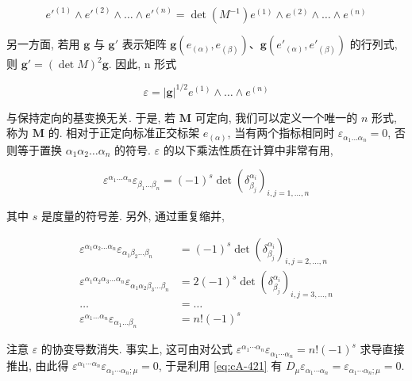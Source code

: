 \[
e'^{(1)} \wedge e'^{(2)} \wedge \dots \wedge e'^{(n)} = \det(M^{-1})e^{(1)} \wedge e^{(2)} \wedge \dots \wedge e^{(n)}
\]

另一方面, 若用 $\mathbf{g}$ 与 $\mathbf{g}'$ 表示矩阵 $\mathbf{g}(e_{(\alpha)}, e_{(\beta)})$、$\mathbf{g}(e'_{(\alpha)}, e'_{(\beta)})$ 的行列式, 则 $\mathbf{g}' = (\det M)^2\mathbf{g}$. 因此, n 形式

\begin{equation}
\varepsilon = |\mathbf{g}|^{1/2}e^{(1)} \wedge \dots \wedge e^{(n)}\label{eq:cA-420}
\end{equation}

与保持定向的基变换无关. 于是, 若 $\mathbf{M}$ 可定向, 我们可以定义一个唯一的 $n$ 形式, 称为 $\mathbf{M}$ 的. 相对于正定向标准正交标架 $e_{(\alpha)}$, 当有两个指标相同时 $\varepsilon_{\alpha_1\dots\alpha_n} = 0$, 否则等于置换 $\alpha_{1}\alpha_{2}\ldots\alpha_{n}$ 的符号. $\varepsilon$ 的以下乘法性质在计算中非常有用,

\begin{equation}
\varepsilon^{\alpha_{1}\dots\alpha_{n}}\varepsilon_{\beta_{1}\dots\beta_{n}} = (-1)^{s}\det(\delta^{\alpha_{i}}_{\beta_{j}})_{i, j = 1, \dots, n}\label{eq:cA-421}
\end{equation}

其中 $s$ 是度量的符号差. 另外, 通过重复缩并,

\[
\begin{aligned}
\varepsilon^{\alpha_{1}\alpha_{2}\ldots\alpha_{n}}\varepsilon_{\alpha_{1}\beta_{2}\ldots\beta_{n}} &= (-1)^{s}\det(\delta^{\alpha_{i}}_{\beta_{j}})_{i, j = 2, \ldots, n} \\
\varepsilon^{\alpha_{1}\alpha_{2}\alpha_{3}\ldots\alpha_{n}}\varepsilon_{\alpha_{1}\alpha_{2}\beta_{3}\ldots\beta_{n}} &= 2(-1)^{s}\det(\delta^{\alpha_{i}}_{\beta_{j}})_{i, j = 3, \ldots, n} \\
\ldots &= \ldots \\
\varepsilon^{\alpha_{1}\ldots\alpha_{n}}\varepsilon_{\alpha_{1}\ldots\beta_{n}} &= n!(-1)^{s}
\end{aligned}
\]

注意 $\varepsilon$ 的协变导数消失. 事实上, 这可由对公式 $\varepsilon^{\alpha_{1}\cdots\alpha_{n}}\varepsilon_{\alpha_{1}\cdots\alpha_{n}} = n!(-1)^{s}$ 求导直接推出, 由此得 $\varepsilon^{\alpha_{1}\cdots\alpha_{n}}\varepsilon_{\alpha_{1}\cdots\alpha_{n};\mu} = 0$, 于是利用 \eqref{eq:cA-421} 有 $D_{\mu}\varepsilon_{\alpha_{1}\cdots\alpha_{n}} = \varepsilon_{\alpha_{1}\cdots\alpha_{n};\mu} = 0$.

